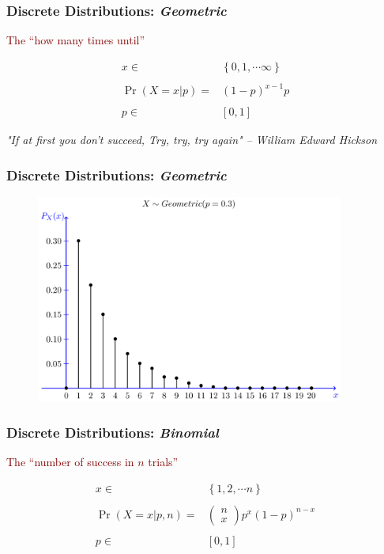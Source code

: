 \documentclass[xcolor={dvipsnames}]{beamer}
\begin{document}
\frame
{
 \frametitle{Discrete Distributions: \emph{Geometric}}

 
 \Large
\textcolor{Maroon}{The ``how many times until''}

 \LARGE
 
\begin{align*}
x \in {} & \left\{0,1,\cdots \infty \right\} \\\\
\Pr(X=x|p) = {} & (1-p)^{x-1}p\\\\
p \in {} & \left[0,1\right]
\end{align*}

\vspace{.25in}
\scriptsize
\emph{"If at first you don't succeed,
Try, try, try again" -- William Edward Hickson}

}

\frame
{
 \frametitle{Discrete Distributions: \emph{Geometric}}

\begin{figure}
\centering
\includegraphics[width=4in]{stuff/geometric.png} 
\end{figure}
}

\frame
{
 \frametitle{Discrete Distributions: \emph{Binomial} }

 \Large
\textcolor{Maroon}{The ``number of success in $n$ trials''}

\LARGE

\begin{align*}
x \in {} & \left\{1,2, \cdots n \right\} \\\\
\Pr(X=x|p,n) = {} & \left(\begin{array}{c}n\\x\end{array} \right)  p^x(1-p)^{n-x}\\\\
p \in {} & \left[0,1\right]
\end{align*}

}
\end{document}

